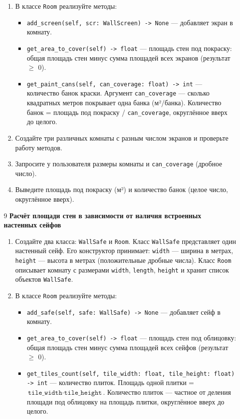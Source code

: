 \begin{enumerate}
\begin{enumerate}
    \item В классе \texttt{Room} реализуйте методы:  
    \begin{itemize}
        \item \texttt{add\_screen(self, scr: WallScreen) -> None} — добавляет экран в комнату.
        \item \texttt{get\_area\_to\_cover(self) -> float} — площадь стен под покраску: общая площадь стен минус сумма площадей всех экранов (результат $\geqslant$ 0).
        \item \texttt{get\_paint\_cans(self, can\_coverage: float) -> int} — количество банок краски. Аргумент \texttt{can\_coverage} — сколько квадратных метров покрывает одна банка (м²/банка). Количество банок = площадь под покраску / \texttt{can\_coverage}, округлённое вверх до целого.
    \end{itemize}

    \item Создайте три различных комнаты с разным числом экранов и проверьте работу методов.

    \item Запросите у пользователя размеры комнаты и \texttt{can\_coverage} (дробное число).

    \item Выведите площадь под покраску (м²) и количество банок (целое число, округлённое вверх).
\end{enumerate}

\item[9] \textbf{Расчёт площади стен в зависимости от наличия встроенных настенных сейфов}
\begin{enumerate}
    \item Создайте два класса: \texttt{WallSafe} и \texttt{Room}.  
    Класс \texttt{WallSafe} представляет один настенный сейф. Его конструктор принимает:  
    \texttt{width} — ширина в метрах,  
    \texttt{height} — высота в метрах (положительные дробные числа).  
    Класс \texttt{Room} описывает комнату с размерами \texttt{width}, \texttt{length}, \texttt{height} и хранит список объектов \texttt{WallSafe}.

    \item В классе \texttt{Room} реализуйте методы:  
    \begin{itemize}
        \item \texttt{add\_safe(self, safe: WallSafe) -> None} — добавляет сейф в комнату.
        \item \texttt{get\_area\_to\_cover(self) -> float} — площадь стен под облицовку: общая площадь стен минус сумма площадей всех сейфов (результат $\geqslant$ 0).
        \item \texttt{get\_tiles\_count(self, tile\_width: float, tile\_height: float) -> int} — количество плиток. Площадь одной плитки = \(\texttt{tile\_width} \cdot \texttt{tile\_height}\). Количество плиток — частное от деления площади под облицовку на площадь плитки, округлённое вверх до целого.
    \end{itemize}


\end{enumerate}
\end{enumerate}
